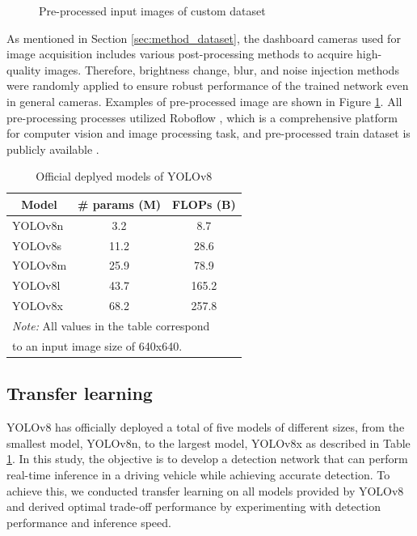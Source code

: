 \begin{figure}[b!]
\caption{Pre-processed input images of custom dataset}
\label{fig:custom_dataset}%
\end{figure}

As mentioned in Section \ref{sec:method_dataset}, the dashboard cameras used for image acquisition includes various post-processing methods to acquire high-quality images.
Therefore, brightness change, blur, and noise injection methods were randomly applied to ensure robust performance of the trained network even in general cameras.
Examples of pre-processed image are shown in Figure \ref{fig:custom_dataset}.
All pre-processing processes utilized Roboflow \cite{roboflow}, which is a comprehensive platform for computer vision and image processing task, and pre-processed train dataset is publicly available \cite{brake-light-detection_dataset}.

\begin{table}[h]
    \caption{Official deplyed models of YOLOv8}
    \label{tab:yolov8}
    \begin{tabular}{lcc}
    \toprule
    \multicolumn{1}{c}{Model}   & \# params (M) & FLOPs (B) \\
    \midrule
    YOLOv8n & 3.2        & 8.7       \\
    YOLOv8s & 11.2       & 28.6      \\
    YOLOv8m & 25.9       & 78.9      \\
    YOLOv8l & 43.7       & 165.2     \\
    YOLOv8x & 68.2       & 257.8     \\
    \bottomrule
    \multicolumn{3}{l}{\textit{Note:} All values in the table correspond}\\
    \multicolumn{3}{l}{\qquad \; to an input image size of 640x640.}
    \end{tabular}%
\end{table}

\subsection{Transfer learning}
\label{sec:exp_transfer}
YOLOv8 \cite{YOLOv8} has officially deployed a total of five models of different sizes, from the smallest model, YOLOv8n, to the largest model, YOLOv8x as described in Table \ref{tab:yolov8}.
In this study, the objective is to develop a detection network that can perform real-time inference in a driving vehicle while achieving accurate detection. 
To achieve this, we conducted transfer learning on all models provided by YOLOv8 and derived optimal trade-off performance by experimenting with detection performance and inference speed.

